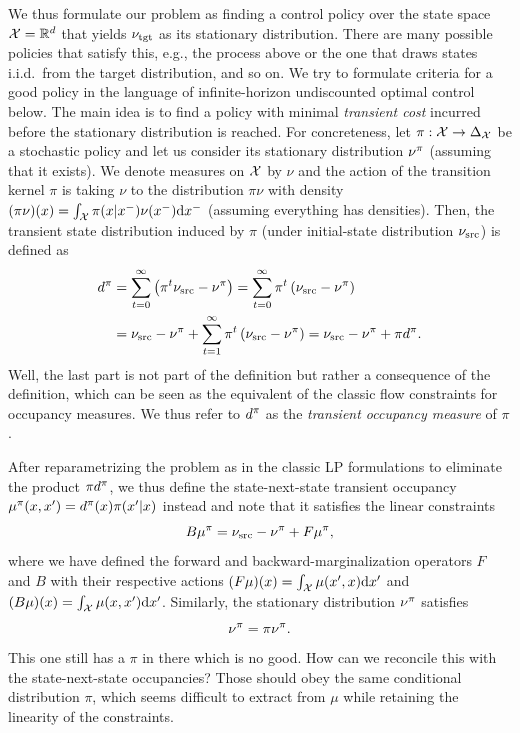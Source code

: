 \documentclass[twoside,10pt]{jmlr}
\begin{document}
We thus formulate our problem as finding a control policy over the state space $\mathcal{X} = \mathbb{R}^d$ that yields $\nu_{\text{tgt}}$ as its 
stationary distribution. There are many possible policies that satisfy this, e.g., the process above or the one that 
draws states i.i.d.~from the target distribution, and so on. We try to formulate criteria for a good policy in the 
language of infinite-horizon undiscounted optimal control below. The main idea is to find a policy with minimal 
\emph{transient cost} incurred before the stationary distribution is reached. For concreteness, let $\pi:\mathcal{X} \rightarrow 
\Delta_{\mathcal{X}}$ be a stochastic policy and let us consider its stationary distribution $\nu^\pi$ (assuming that it exists). 
We denote measures on $\mathcal{X}$ by $\nu$ and the action of the transition kernel $\pi$ is taking $\nu$ to the distribution 
$\pi\nu$ with density $(\pi\nu)(x) = \int_{\mathcal{X}} \pi(x|x^-) \nu(x^-) \mathrm{d} x^-$ (assuming everything has densities). Then, 
the transient state distribution induced by $\pi$ (under initial-state distribution $\nu_{\text{src}}$) is defined as
\begin{align*}
 d^\pi &= \sum_{t=0}^\infty \left(\pi^t \nu_{\text{src}} - \nu^\pi\right) = \sum_{t=0}^\infty \pi^t \left(\nu_{\text{src}} - \nu^\pi\right)
 \\
 &= \nu_{\text{src}} - \nu^\pi + \sum_{t=1}^\infty \pi^t \left(\nu_{\text{src}} - \nu^\pi\right) = \nu_{\text{src}} - \nu^\pi + \pi d^\pi.
\end{align*}
Well, the last part is not part of the definition but rather a consequence of the definition, which can be seen as the 
equivalent of the classic flow constraints for occupancy measures. We thus refer to $d^\pi$ as the \emph{transient 
occupancy measure} of $\pi$.

After reparametrizing the problem as in the classic LP formulations to eliminate the product $\pi d^\pi$, we thus define 
the state-next-state transient occupancy $\mu^\pi(x,x')=d^\pi(x)\pi(x'|x)$ instead and note that it satisfies the linear 
constraints
\[
 B\mu^\pi = \nu_{\text{src}} - \nu^\pi + F\mu^\pi,
\]
where we have defined the forward and backward-marginalization operators $F$ and $B$ with their respective actions 
$(F\mu)(x) = \int_{\mathcal{X}} \mu(x',x) \mathrm{d} x'$ and $(B\mu)(x) = \int_{\mathcal{X}} \mu(x,x') \mathrm{d} x'$. Similarly, the 
stationary distribution $\nu^\pi$ satisfies
\[
 \nu^\pi = \pi \nu^\pi.
\]
This one still has a $\pi$ in there which is no good. How can we reconcile this with the state-next-state occupancies? 
Those should obey the same conditional distribution $\pi$, which seems difficult to extract from $\mu$ while retaining 
the linearity of the constraints.
\end{document}
